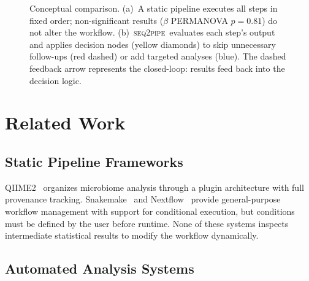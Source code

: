 \documentclass[11pt,a4paper]{article}
\newcommand{\seqpipe}{\textsc{seq2pipe}}
\begin{document}
\begin{figure}[t]
\caption{Conceptual comparison.
(a)~A static pipeline executes all steps in fixed order; non-significant
results ($\beta$ PERMANOVA $p = 0.81$) do not alter the workflow.
(b)~\seqpipe\ evaluates each step's output and applies decision nodes
(yellow diamonds) to skip unnecessary follow-ups (red dashed) or add
targeted analyses (blue).
The dashed feedback arrow represents the closed-loop: results feed back
into the decision logic.}
\label{fig:concept}
\end{figure}

\section{Related Work}
\label{sec:related}

\subsection{Static Pipeline Frameworks}

QIIME2~\citep{qiime2} organizes microbiome analysis through a
plugin architecture with full provenance tracking.
Snakemake~\citep{snakemake} and Nextflow~\citep{nextflow} provide
general-purpose workflow management with support for conditional
execution, but conditions must be defined by the user before
runtime.
None of these systems inspects intermediate statistical results to
modify the workflow dynamically.

\subsection{Automated Analysis Systems}
\end{document}
